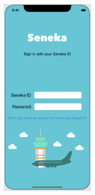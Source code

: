 \documentclass[]{article}
\begin{document}

\begin{figure}[H]
\centering
\includegraphics[height=4.0in]{Figura_1.jpg}
\end{figure}
\end{document}
